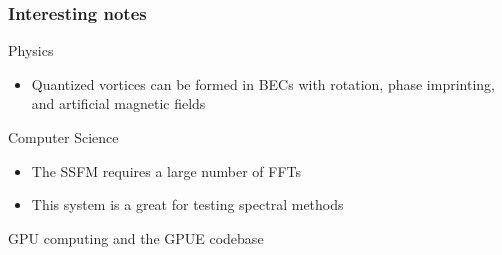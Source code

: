 \documentclass{beamer}
\begin{document}
\begin{frame}
\frametitle{Interesting notes}
Physics
\begin{itemize}
\item Quantized vortices can be formed in BECs with rotation, phase imprinting, and artificial magnetic fields
\end{itemize}

\vspace{0.5cm}
\pause

Computer Science
\begin{itemize}
\item The SSFM requires a large number of FFTs
\item This system is a great for testing spectral methods
\end{itemize}

\end{frame}

\begin{frame}
\center \huge GPU computing and the GPUE codebase
\end{frame}
\end{document}
